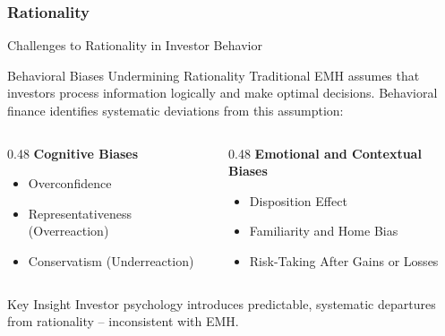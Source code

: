 \subsubsection{Rationality}
\begin{frame}{Challenges to Rationality in Investor Behavior}
	
	\begin{block}{Behavioral Biases Undermining Rationality}
		Traditional EMH assumes that investors process information logically and make optimal decisions. Behavioral finance identifies systematic deviations from this assumption:
	\end{block}
	
	\begin{columns}
		\begin{column}{0.48\textwidth}
			\textbf{Cognitive Biases}
			\begin{itemize}
				\item Overconfidence
				\item Representativeness (Overreaction)
				\item Conservatism (Underreaction)
			\end{itemize}
		\end{column}
		
		\begin{column}{0.48\textwidth}
			\textbf{Emotional and Contextual Biases}
			\begin{itemize}
				\item Disposition Effect
				\item Familiarity and Home Bias
				\item Risk-Taking After Gains or Losses
			\end{itemize}
		\end{column}
	\end{columns}
	
	\begin{alertblock}{Key Insight}
		Investor psychology introduces predictable, systematic departures from rationality -- inconsistent with EMH.
	\end{alertblock}
	
\end{frame}

